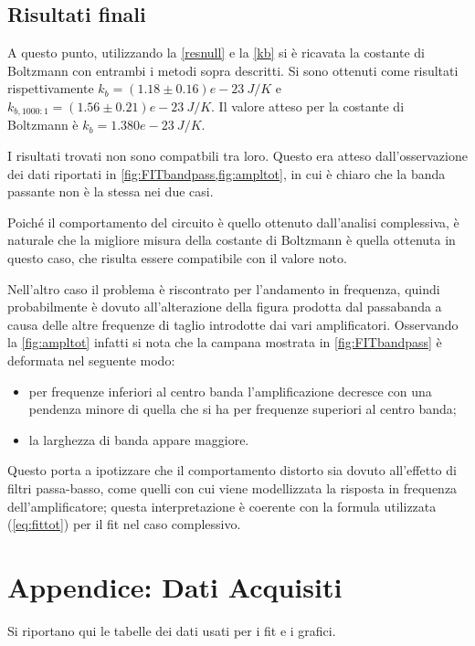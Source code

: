 \documentclass[a4paper,10pt]{article}
\begin{document}


\subsection{Risultati finali}
A questo punto, utilizzando la \eqref{resnull} e la \eqref{kb} si è ricavata la costante di Boltzmann con entrambi i metodi sopra descritti. Si sono ottenuti come risultati rispettivamente $k_b = (1.18\pm0.16)e-23~J/K$ e $k_{b,1000:1} = (1.56\pm0.21)e-23~J/K $. Il valore atteso per la costante di Boltzmann è $k_b = 1.380e-23~J/K$.
\newline

I risultati trovati non sono compatbili tra loro. Questo era atteso dall'osservazione dei dati riportati in \cref{fig:FITbandpass,fig:ampltot}, in cui è chiaro che la banda passante non è la stessa nei due casi.

Poiché il comportamento del circuito è quello ottenuto dall'analisi complessiva, è naturale che la migliore misura della costante di Boltzmann è quella ottenuta in questo caso, che risulta essere compatibile con il valore noto.

Nell'altro caso il problema è riscontrato per l'andamento in frequenza, quindi probabilmente è dovuto all'alterazione della figura prodotta dal passabanda a causa delle altre frequenze di taglio introdotte dai vari amplificatori.
Osservando la \cref{fig:ampltot} infatti si nota che la campana mostrata in \cref{fig:FITbandpass} è deformata nel seguente modo:
\begin{itemize}
	\item per frequenze inferiori al centro banda l'amplificazione decresce con una pendenza minore di quella che si ha per frequenze superiori al centro banda;
	\item la larghezza di banda appare maggiore.
\end{itemize}
Questo porta a ipotizzare che il comportamento distorto sia dovuto all'effetto di filtri passa-basso, come quelli con cui viene modellizzata la risposta in frequenza dell'amplificatore; questa interpretazione è coerente con la formula utilizzata (\cref{eq:fittot}) per il fit nel caso complessivo.

\pagebreak

\section{Appendice: Dati Acquisiti}
Si riportano qui le tabelle dei dati usati per i fit e i grafici.
\end{document}
